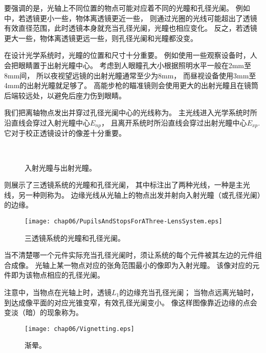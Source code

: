要强调的是，光轴上不同位置的物点可能对应着不同的光瞳和孔径光阑。
例如中，若透镜更小一些，物体离透镜更近一些，
则通过光圈的光线可能超出了透镜有效直径范围，此时透镜本身就充当孔径光阑，光瞳也相应变化。
反之，若透镜更大一些，物体离透镜更远一些，则孔径光阑和光瞳都没变。

在设计光学系统时，光瞳的位置和尺寸十分重要。
例如使用一些观察设备时，人会把眼睛置于出射光瞳中心。
考虑到人眼瞳孔大小根据照明水平一般在2mm至8mm间，
所以夜视望远镜的出射光瞳通常至少为8mm，
而昼视设备使用3mm至4mm的出射光瞳就足够了。
高能步枪的瞄准镜则会使用更大的出射光瞳且在镜筒后端较远处，以避免后座力伤到眼睛。

我们把离轴物点发出并穿过孔径光阑中心的光线称为。
主光线进入光学系统时所沿直线会穿过入射光瞳中心$E_{np}$，
且离开系统时所沿直线会穿过出射光瞳中心$E_{xp}$.
它对于校正透镜设计的像差十分重要。
\begin{figure}[htbp]
    \centering
    \\
    \caption{入射光瞳与出射光瞳。}
    \label{fig:6.49}
\end{figure}

则展示了三透镜系统的光瞳和孔径光阑，
其中标注出了两种光线，一种是主光线，另一种则称为。
边缘光线从光轴上的物点出发并射向入射光瞳（或孔径光阑）的边缘。
\begin{figure}[htbp]
    \centering\texttt{[image: chap06/PupilsAndStopsForAThree-LensSystem.eps]}
    \caption{三透镜系统的光瞳和孔径光阑。}
    \label{fig:6.50}
\end{figure}

当不清楚哪一个元件实际充当孔径光阑时，须让系统的每个元件被其左边的元件组合成像。
光轴上某一物点对应的张角范围最小的像即为入射光瞳。
该像对应的元件即为该物点相应的孔径光阑。

注意中，当物点在光轴上时，透镜$L_1$的边缘充当孔径光阑；
当物点远离光轴时，到达成像平面的对应光锥变窄，有效孔径光阑变小。
像这样图像靠近边缘的点会变淡（暗）的现象称为。
\begin{figure}[htbp]
    \centering\texttt{[image: chap06/Vignetting.eps]}
    \caption{渐晕。}
    \label{fig:6.51}
\end{figure}

